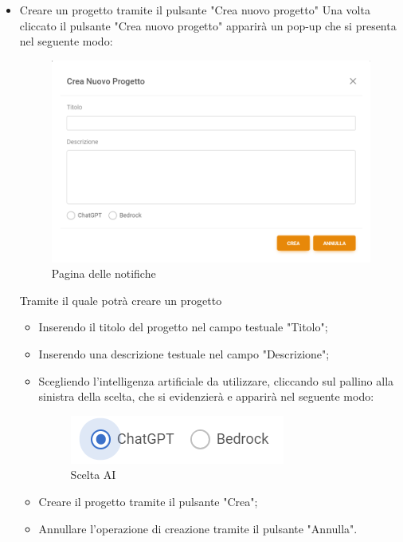 \documentclass{article}
\begin{document}
\begin{itemize}
    \item Creare un progetto tramite il pulsante "Crea nuovo progetto"
    Una volta cliccato il pulsante "Crea nuovo progetto" apparirà un pop-up che si presenta nel seguente modo:
\begin{figure}[H]
      \centering
      \includegraphics[width=\textwidth]{documenti/Screenshot manuale utente/crea nuovo progetto.png}
      \caption{Pagina delle notifiche}
      \label{notifiche}
    \end{figure} 
    Tramite il quale potrà creare un progetto
    \begin{itemize}
        \item Inserendo il titolo del progetto nel campo testuale "Titolo";
        \item Inserendo una descrizione testuale nel campo "Descrizione";
        \item Scegliendo l'intelligenza artificiale da utilizzare, cliccando sul pallino alla sinistra della scelta, che si evidenzierà e apparirà nel seguente modo:
        \begin{figure}[h]
      \centering
      \includegraphics{documenti/Screenshot manuale utente/scelta ai.png}
      \caption{Scelta AI}
      \label{sceltaai}
    \end{figure} 
        \item Creare il progetto tramite il pulsante "Crea";
        \item Annullare l'operazione di creazione tramite il pulsante "Annulla".

\end{itemize}
\end{itemize}
\end{document}
